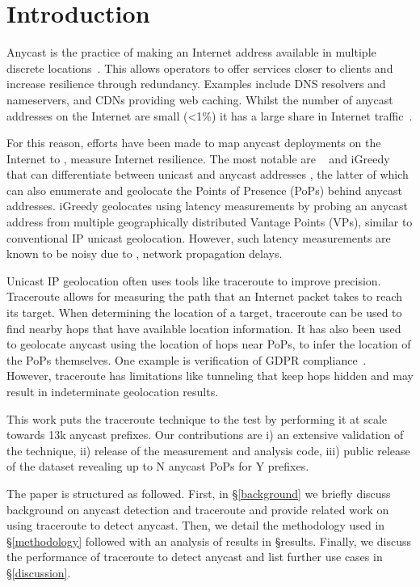 


\section{Introduction}\label{introduction}
Anycast is the practice of making an Internet address available in multiple discrete locations~\cite{rfc4786}.
This allows operators to offer services closer to clients and increase resilience through redundancy.
Examples include DNS resolvers and nameservers, and CDNs providing web caching.
Whilst the number of anycast addresses on the Internet are small (<1\%) %
it has a large share in Internet traffic~\cite{anycast_cdn}. %

For this reason, efforts have been made to map anycast deployments on the Internet to \eg, measure Internet resilience.
The most notable are \manycasttwo~\cite{manycast2} and iGreedy~\cite{igreedy} that can differentiate between unicast and anycast addresses %
, the latter of which can also enumerate and geolocate the Points of Presence (PoPs) behind anycast addresses.
iGreedy geolocates using latency measurements by probing an anycast address from multiple geographically distributed Vantage Points (VPs), similar to conventional IP unicast geolocation.
However, such latency measurements are known to be noisy due to \eg, network propagation delays.

Unicast IP geolocation often uses tools like traceroute to improve precision.
Traceroute allows for measuring the path that an Internet packet takes to reach its target.
When determining the location of a target, traceroute can be used to find nearby hops that have available location information.
It has also been used to geolocate anycast using the location of hops near PoPs, to infer the location of the PoPs themselves.
One example is verification of GDPR compliance~\cite{hunter}.
However, traceroute has limitations like tunneling %
that keep hops hidden and may result in indeterminate geolocation results.

This work puts the traceroute technique to the test by performing it at scale towards 13k anycast prefixes. %
Our contributions are i) an extensive validation of the technique, ii) release of the measurement and analysis code, iii) public release of the dataset revealing up to N anycast PoPs for Y prefixes.

The paper is structured as followed.
First, in \S\ref{background} we briefly discuss background on anycast detection and traceroute and provide related work on using traceroute to detect anycast.
Then, we detail the methodology used in \S\ref{methodology} followed with an analysis of results in \S{results}.
Finally, we discuss the performance of traceroute to detect anycast and list further use cases in \S\ref{discussion}.
